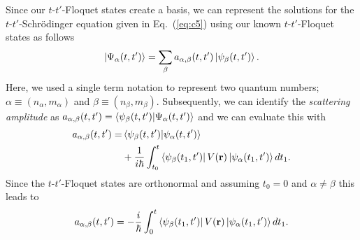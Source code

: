 \documentclass[
 reprint,
 amsmath,amssymb,
 aps,
 prb,
]{revtex4-2}
\begin{document}
\begin{appendix}
Since our $t$-$t'$-Floquet states create a basis, we can represent the solutions for the $t$-$t'$-Schrödinger equation given in Eq.~(\ref{eq:c5}) using our known $t$-$t'$-Floquet states as follows
\begin{equation} \label{eq:c12}
  \ket{\Psi_{\alpha}(t,t')} = \sum_{\beta} a_{\alpha,\beta}(t,t')
  \ket{\psi_{\beta}(t,t')}.
\end{equation}
Here, we used a single term notation to represent two quantum numbers; $\alpha \equiv (n_{\alpha},m_{\alpha})$ and $\beta \equiv (n_{\beta},m_{\beta})$.
Subsequently, we can identify the \textit{scattering amplitude} as $a_{\alpha,\beta}(t,t') =
\braket{\psi_{\beta}(t,t')}{\Psi_{\alpha}(t,t')}$ and we can evaluate this with
\begin{equation} \label{eq:c13}
  \begin{aligned}
  a_{\alpha,\beta}(t,t') = &
  \braket{\psi_{\beta}(t,t')}{\psi_{\alpha}(t,t')} \\
  &+
  \frac{1}{i\hbar}
  \int_{t_0}^t
  \bra{\psi_{\beta}(t_1,t')}
  V(\vb{r}) \ket{\psi_{\alpha}(t_1,t')} dt_1.
  \end{aligned}
\end{equation}
Since the $t$-$t'$-Floquet states are orthonormal and assuming $t_0 = 0$ and $\alpha \neq \beta$ this leads to
\begin{equation} \label{eq:c14}
  a_{\alpha,\beta}(t,t') =
  -
  \frac{i}{\hbar}
  \int_{0}^t
  \bra{\psi_{\beta}(t_1,t')}
  V(\vb{r}) \ket{\psi_{\alpha}(t_1,t')} dt_1.
\end{equation}


\end{appendix}
\end{document}
